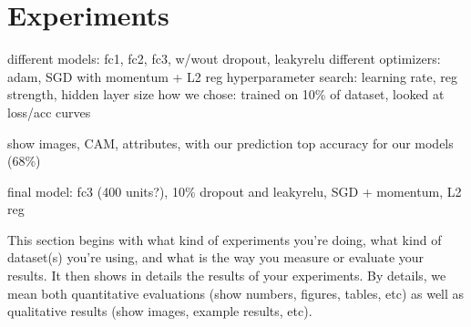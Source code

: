 \documentclass[10pt,twocolumn,letterpaper]{article}
\begin{document}
\section{Experiments}
\label{sec:experiments}
different models: fc1, fc2, fc3, w/wout dropout, leakyrelu
different optimizers: adam, SGD with momentum + L2 reg
hyperparameter search: learning rate, reg strength, hidden layer size
how we chose: trained on 10\% of dataset, looked at loss/acc curves

show images, CAM, attributes, with our prediction
top accuracy for our models (68\%)

final model: fc3 (400 units?), 10\% dropout and leakyrelu, SGD + momentum, L2 reg

This section begins with what kind of experiments you're doing, what kind of dataset(s) you're using, and what is the way you measure or evaluate your results. It then shows in details the results of your experiments. By details, we mean both quantitative evaluations (show numbers, figures, tables, etc) as well as qualitative results (show images, example results, etc).
\end{document}
